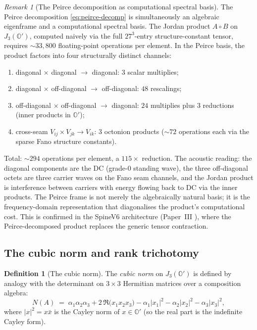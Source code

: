 \documentclass[11pt,a4paper]{article}
\theoremstyle{plain}
\theoremstyle{definition}
\newtheorem{definition}[theorem]{Definition}
\theoremstyle{remark}
\newtheorem{remark}[theorem]{Remark}
\numberwithin{equation}{section}
\providecommand{\Os}{\mathbb{O}'}
\begin{document}
\begin{remark}[The Peirce decomposition as computational spectral basis]
\label{rmk:peirce-computational}
The Peirce decomposition \eqref{eq:peirce-decomp} is simultaneously
an algebraic eigenframe and a computational spectral basis.  The
Jordan product $A \circ B$ on $J_3(\Os)$, computed naively via
the full $27^3$-entry structure-constant tensor, requires
$\sim 33{,}800$ floating-point operations per element.  In the
Peirce basis, the product factors into four structurally distinct
channels:
\begin{enumerate}[label=\textnormal{(\roman*)},nosep]
\item diagonal $\times$ diagonal $\to$ diagonal: $3$ scalar multiplies;
\item diagonal $\times$ off-diagonal $\to$ off-diagonal: $48$ rescalings;
\item off-diagonal $\times$ off-diagonal $\to$ diagonal: $24$ multiplies
  plus $3$ reductions (inner products in $\Os$);
\item cross-seam $V_{ij} \times V_{jk} \to V_{ik}$: $3$ octonion
  products ($\sim 72$ operations each via the sparse Fano structure
  constants).
\end{enumerate}
Total: $\sim 294$ operations per element, a $115\times$ reduction.
The acoustic reading: the diagonal components are the DC (grade-$0$
standing wave), the three off-diagonal octets are three carrier
waves on the Fano seam channels, and the Jordan product is
interference between carriers with energy flowing back to DC via
the inner products.  The Peirce frame is not merely the
algebraically natural basis; it is the frequency-domain
representation that diagonalises the product's computational
cost.  This is confirmed in the SpineV6 architecture
(Paper~III \cite[\S 12]{paper-III-monad}), where the Peirce-decomposed
product replaces the generic tensor contraction.
\end{remark}

\subsection{The cubic norm and rank trichotomy}

\begin{definition}[The cubic norm]
\label{def:cubic-norm}
The \emph{cubic norm} on $J_3(\Os)$ is defined by analogy with
the determinant on $3 \times 3$ Hermitian matrices over a
composition algebra:
\begin{equation}
  N(A) \;=\; \alpha_1 \alpha_2 \alpha_3
              + 2\,\Re\bigl(x_1 x_2 x_3\bigr)
              - \alpha_1 |x_1|^2 - \alpha_2 |x_2|^2 - \alpha_3 |x_3|^2,
  \label{eq:cubic-norm}
\end{equation}
where $|x|^2 = x \bar x$ is the Cayley norm of $x \in \Os$ (so the
real part is the indefinite Cayley form).
\end{definition}
\end{document}
